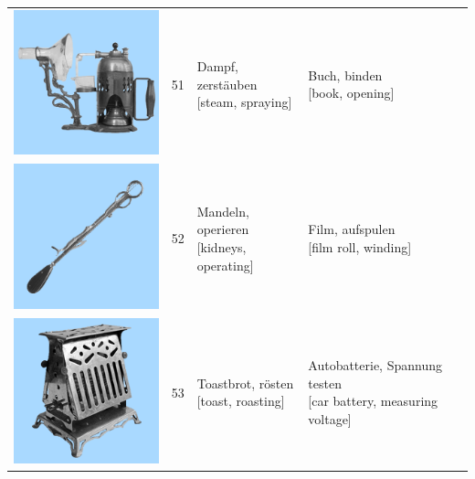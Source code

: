 \documentclass[
  english,
  man,floatsintext]{apa7}
\begin{document}
\begin{center}
\begin{ThreePartTable}
{\begin{longtable}{llll}
\includegraphics[valign=c, scale=0.23]{../materials/unfamiliar/51.png} & 51 & \makecell[l]{Dampf, zerstäuben\\{[steam, spraying]}} & \makecell[l]{Buch, binden\\{[book, opening]}}\\
\includegraphics[valign=c, scale=0.23]{../materials/unfamiliar/52.png} & 52 & \makecell[l]{Mandeln, operieren\\{[kidneys, operating]}} & \makecell[l]{Film, aufspulen\\{[film roll, winding]}}\\
\includegraphics[valign=c, scale=0.23]{../materials/unfamiliar/53.png} & 53 & \makecell[l]{Toastbrot, rösten\\{[toast, roasting]}} & \makecell[l]{Autobatterie, Spannung testen\\{[car battery, measuring voltage]}}\\

\end{longtable}}
\end{ThreePartTable}
\end{center}
\end{document}
